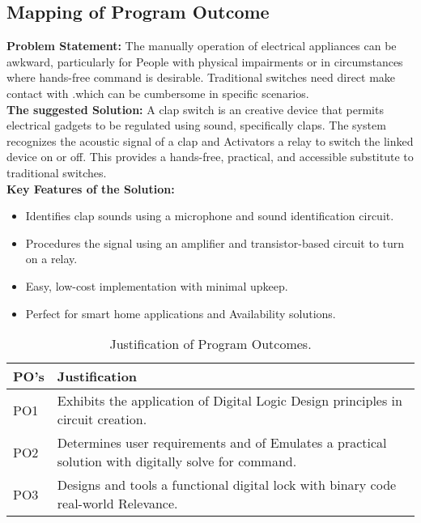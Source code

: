 \subsection{Mapping of Program Outcome} 
\textbf{Problem Statement:}
The manually operation of electrical appliances can be awkward, particularly for People with physical impairments or in circumstances where hands-free command is desirable. Traditional switches need direct make contact with .which can be cumbersome in specific scenarios.\\
\textbf{The suggested Solution:}
A clap switch is an creative device that permits electrical gadgets to be regulated using sound, specifically claps. The system recognizes the acoustic signal of a clap and Activators a relay to switch the linked device on or off. This provides a hands-free, practical, and accessible substitute to traditional switches.\\
\textbf{Key Features of the Solution:}
\begin{itemize}
\item Identifies clap sounds using a microphone and sound identification circuit.
\item Procedures the signal using an amplifier and transistor-based circuit to turn on a relay.
\item Easy, low-cost implementation with minimal upkeep.
\item Perfect for smart home applications and Availability solutions.\cite{4.3.1}
\end{itemize}

\begin{center}
    \begin{table}[ht]
    
        \begin{tabular}{|p{}|p{}|}
            \hline
            \textbf{PO's} & \textbf{Justification} \\
            \hline
            PO1 & Exhibits the application of Digital Logic Design principles in circuit creation. \\
            \hline
            PO2 & Determines user requirements and of Emulates a practical solution with digitally solve for command. \\
            \hline
            PO3 & Designs and tools a functional digital lock with binary code real-world Relevance. \\
            \hline
        \end{tabular}
        \centering
        \caption{Justification of Program Outcomes.}
        \label{tab:po_justification}
    \end{table}
\end{center}

